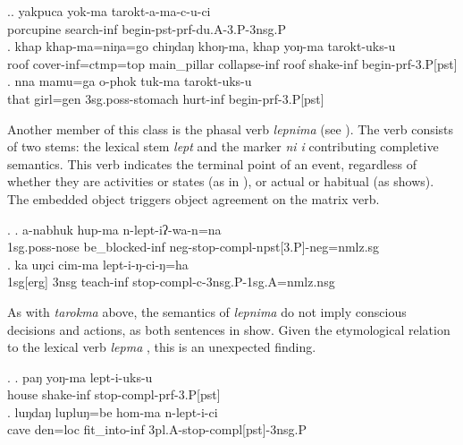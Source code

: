 \ex.\ag. yakpuca yok-ma tarokt-a-ma-c-u-ci\\
porcupine search-{\sc inf} begin{\sc -pst-prf-du.A-3.P-3nsg.P}\\
\bg. khap khap-ma=niŋa=go chiŋdaŋ  khoŋ-ma,  khap yoŋ-ma tarokt-uks-u\\
		roof cover{\sc -inf=ctmp=top} main\_pillar collapse{\sc -inf} 	roof  shake{\sc -inf} begin{\sc [3sg.A]-prf-3.P[pst]}	\\
	 
\bg. nna  mamu=ga    o-phok            tuk-ma           tarokt-uks-u\\
that girl{\sc =gen} {\sc 3sg.poss-}stomach hurt{\sc -inf} begin{\sc [3sg.A]-prf-3.P[pst]}\\
 


Another member of this class is the phasal verb \emph{lepnima}   (see \Next). The verb consists of two stems: the lexical stem \emph{lept}  and the marker \emph{ni \ti i} contributing completive semantics. This verb indicates the terminal point of an event, regardless of whether  they are activities or states (as in \Next[a]), or actual or habitual (as \Next[b] shows).  The embedded object triggers object agreement on the matrix verb.

\ex. \ag. a-nabhuk hup-ma n-lept-iʔ-wa-n=na\\
{\sc 1sg.poss}-nose be\_blocked{\sc -inf} {\sc neg}-stop{\sc [3sg.A]-compl-npst[3.P]-neg=nmlz.sg}\\
\bg. ka uŋci cim-ma lept-i-ŋ-ci-ŋ=ha\\
{\sc 1sg[erg]} {\sc 3nsg} teach{\sc -inf} stop-{\sc compl-c-3nsg.P-1sg.A=nmlz.nsg}\\

As with \emph{tarokma} above, the semantics of \emph{lepnima} do not imply conscious decisions and actions, as both sentences in \Next show. Given the etymological relation to the lexical verb \emph{lepma} , this is an unexpected finding. 

\ex. \ag. paŋ  yoŋ-ma     lept-i-uks-u\\
house shake{\sc -inf} stop{\sc [3sg.A]-compl-prf-3.P[pst]}\\
 
\bg. luŋdaŋ  lupluŋ=be    hom-ma n-lept-i-ci\\
cave den{\sc =loc} fit\_into-{\sc inf} {\sc 3pl.A-}stop-{\sc compl[pst]-3nsg.P}\\
 



